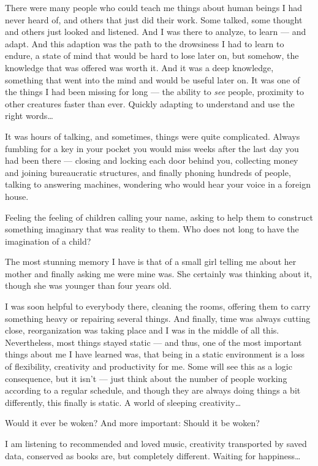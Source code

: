 There were many people who could teach me things about human beings I had never heard of, and others that just did their work. Some talked, some thought and others just looked and listened. And I was there to analyze, to learn --- and adapt. And this adaption was the path to the drowsiness I had to learn to endure, a state of mind that would be hard to lose later on, but somehow, the knowledge that was offered was worth it. And it was a deep knowledge, something that went into the mind and would be useful later on. It was one of the things I had been missing for long --- the ability to \emph{see} people, proximity to other creatures faster than ever. Quickly adapting to understand and use the right words\ldots

It was hours of talking, and sometimes, things were quite complicated. Always fumbling for a key in your pocket you would miss weeks after the last day you had been there --- closing and locking each door behind you, collecting money and joining bureaucratic structures, and finally phoning hundreds of people, talking to answering machines, wondering who would hear your voice in a foreign house.

Feeling the feeling of children calling your name, asking to help them to construct something imaginary that was reality to them. Who does not long to have the imagination of a child?

The most stunning memory I have is that of a small girl telling me about her mother and finally asking me were mine was. She certainly was thinking about it, though she was younger than four years old.

I was soon helpful to everybody there, cleaning the rooms, offering them to carry something heavy or repairing several things. And finally, time was always cutting close, reorganization was taking place and I was in the middle of all this. Nevertheless, most things stayed static --- and thus, one of the most important things about me I have learned was, that being in a static environment is a loss of flexibility, creativity and productivity for me. Some will see this as a logic consequence, but it isn't --- just think about the number of people working according to a regular schedule, and though they are always doing things a bit differently, this finally is static. A world of sleeping creativity\ldots

Would it ever be woken? And more important: Should it be woken?

I am listening to recommended and loved music, creativity transported by saved data, conserved as books are, but completely different. Waiting for happiness\ldots

